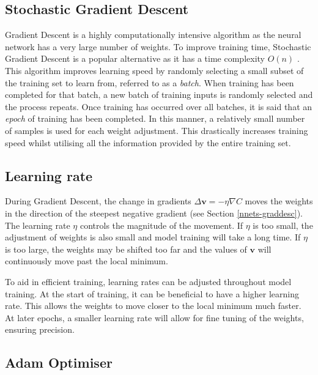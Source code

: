 \subsection*{Stochastic Gradient Descent}\label{nnets-stochgraddesc}

Gradient Descent is a highly computationally intensive algorithm as the neural network has a very large number of weights. To improve training time, Stochastic Gradient Descent is a popular alternative as it has a time complexity $O(n)$ \cite{Robbins1951}. This algorithm improves learning speed by randomly selecting a small subset of the training set to learn from, referred to as a \textit{batch}. When training has been completed for that batch, a new batch of training inputs is randomly selected and the process repeats. Once training has occurred over all batches, it is said that an \textit{epoch} of training has been completed. In this manner, a relatively small number of samples is used for each weight adjustment. This drastically increases training speed whilst utilising all the information provided by the entire training set.

\subsection*{Learning rate}\label{nnets-learningrate}

During Gradient Descent, the change in gradients $\Delta\mathbf{v} = -\eta\nabla C$ moves the weights in the direction of the steepest negative gradient (see Section \ref{nnets-graddesc}). The learning rate $\eta$ controls the magnitude of the movement. If $\eta$ is too small, the adjustment of weights is also small and model training will take a long time. If $\eta$ is too large, the weights may be shifted too far and the values of $\mathbf{v}$ will continuously move past the local minimum.


To aid in efficient training, learning rates can be adjusted throughout model training. At the start of training, it can be beneficial to have a higher learning rate. This allows the weights to move closer to the local minimum much faster. At later epochs, a smaller learning rate will allow for fine tuning of the weights, ensuring precision.

\subsection*{Adam Optimiser}\label{nnets-adam}

